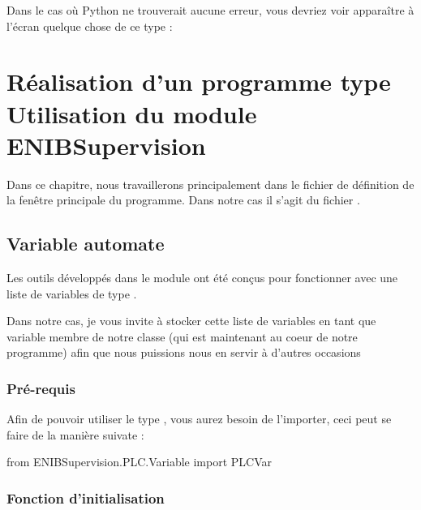 \smallSkip

Dans le cas où Python ne trouverait aucune erreur, vous devriez voir apparaître à l'écran quelque chose de ce type :






\chapter{Réalisation d'un programme type\protect\\Utilisation du module ENIBSupervision}

Dans ce chapitre, nous travaillerons principalement dans le fichier de définition de la fenêtre principale du programme. Dans notre cas il s'agit du fichier .\smallSkip




\section{Variable automate}

Les outils développés dans le module  ont été conçus pour fonctionner avec une liste de variables de type .\smallSkip

Dans notre cas, je vous invite à stocker cette liste de variables en tant que variable membre de notre classe  (qui est maintenant au coeur de notre programme) afin que nous puissions nous en servir à d'autres occasions

\subsection{Pré-requis}

Afin de pouvoir utiliser le type , vous aurez besoin de l'importer, ceci peut se faire de la manière suivate :
\begin{pyCode}
from ENIBSupervision.PLC.Variable import PLCVar
\end{pyCode}

\subsection{Fonction d'initialisation}

